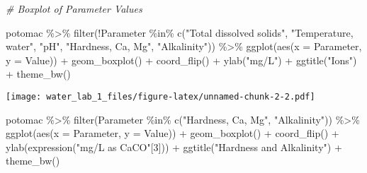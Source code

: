 \documentclass[
]{article}
\newenvironment{Shaded}{\begin{snugshade}}{\end{snugshade}}
\newcommand{\AttributeTok}[1]{\textcolor[rgb]{0.77,0.63,0.00}{#1}}
\newcommand{\CommentTok}[1]{\textcolor[rgb]{0.56,0.35,0.01}{\textit{#1}}}
\newcommand{\DecValTok}[1]{\textcolor[rgb]{0.00,0.00,0.81}{#1}}
\newcommand{\FunctionTok}[1]{\textcolor[rgb]{0.00,0.00,0.00}{#1}}
\newcommand{\NormalTok}[1]{#1}
\newcommand{\SpecialCharTok}[1]{\textcolor[rgb]{0.00,0.00,0.00}{#1}}
\newcommand{\StringTok}[1]{\textcolor[rgb]{0.31,0.60,0.02}{#1}}
\begin{document}
\begin{Shaded}
\begin{Highlighting}[]
\CommentTok{\# Boxplot of Parameter Values}

\NormalTok{potomac }\SpecialCharTok{\%\textgreater{}\%} 
  \FunctionTok{filter}\NormalTok{(}\SpecialCharTok{!}\NormalTok{Parameter }\SpecialCharTok{\%in\%} \FunctionTok{c}\NormalTok{(}\StringTok{"Total dissolved solids"}\NormalTok{,}
                           \StringTok{"Temperature, water"}\NormalTok{, }\StringTok{"pH"}\NormalTok{, }\StringTok{"Hardness, Ca, Mg"}\NormalTok{,}
                           \StringTok{"Alkalinity"}\NormalTok{)) }\SpecialCharTok{\%\textgreater{}\%} 
  \FunctionTok{ggplot}\NormalTok{(}\FunctionTok{aes}\NormalTok{(}\AttributeTok{x =}\NormalTok{ Parameter, }\AttributeTok{y =}\NormalTok{ Value)) }\SpecialCharTok{+}
    \FunctionTok{geom\_boxplot}\NormalTok{() }\SpecialCharTok{+}
    \FunctionTok{coord\_flip}\NormalTok{() }\SpecialCharTok{+}
    \FunctionTok{ylab}\NormalTok{(}\StringTok{"mg/L"}\NormalTok{) }\SpecialCharTok{+}
    \FunctionTok{ggtitle}\NormalTok{(}\StringTok{"Ions"}\NormalTok{) }\SpecialCharTok{+}
    \FunctionTok{theme\_bw}\NormalTok{()}
\end{Highlighting}
\end{Shaded}

\texttt{[image: water\_lab\_1\_files/figure-latex/unnamed-chunk-2-2.pdf]}

\begin{Shaded}
\begin{Highlighting}[]
\NormalTok{potomac }\SpecialCharTok{\%\textgreater{}\%} 
  \FunctionTok{filter}\NormalTok{(Parameter }\SpecialCharTok{\%in\%} \FunctionTok{c}\NormalTok{(}\StringTok{"Hardness, Ca, Mg"}\NormalTok{, }\StringTok{"Alkalinity"}\NormalTok{)) }\SpecialCharTok{\%\textgreater{}\%} 
  \FunctionTok{ggplot}\NormalTok{(}\FunctionTok{aes}\NormalTok{(}\AttributeTok{x =}\NormalTok{ Parameter, }\AttributeTok{y =}\NormalTok{ Value)) }\SpecialCharTok{+}
    \FunctionTok{geom\_boxplot}\NormalTok{() }\SpecialCharTok{+}
    \FunctionTok{coord\_flip}\NormalTok{() }\SpecialCharTok{+}
    \FunctionTok{ylab}\NormalTok{(}\FunctionTok{expression}\NormalTok{(}\StringTok{"mg/L as CaCO"}\NormalTok{[}\DecValTok{3}\NormalTok{])) }\SpecialCharTok{+}
    \FunctionTok{ggtitle}\NormalTok{(}\StringTok{"Hardness and Alkalinity"}\NormalTok{) }\SpecialCharTok{+}
    \FunctionTok{theme\_bw}\NormalTok{()}
\end{Highlighting}
\end{Shaded}
\end{document}
